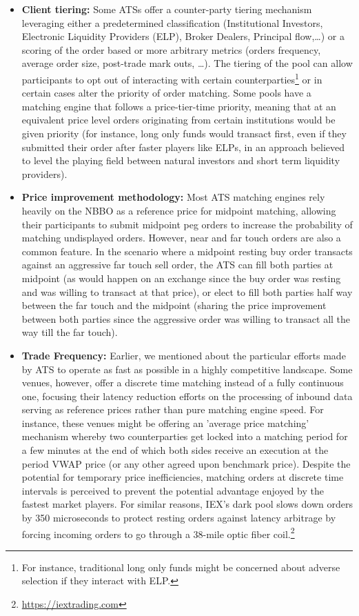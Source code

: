 \begin{itemize}
\item{\textbf{Client tiering:}}\label{in:client_t1} Some ATSs offer a counter-party tiering mechanism leveraging either a predetermined classification (Institutional Investors, Electronic Liquidity Providers (ELP), Broker Dealers, Principal flow,\dots) or a scoring of the order based or more arbitrary metrics (orders frequency, average order size, post-trade mark outs, \dots). The tiering of the pool can allow participants to opt out of interacting with certain counterparties\footnote{For instance, traditional long only funds might be concerned about adverse selection if they interact with ELP.} or in certain cases alter the priority of order matching. Some pools have a matching engine that follows a price-tier-time priority, meaning that at an equivalent price level orders originating from certain institutions would be given priority (for instance, long only funds would transact first, even if they submitted their order after faster players like ELPs, in an approach believed to level the playing field between natural investors and short term liquidity providers). \label{in:client_t2}

\item{\textbf{Price improvement methodology:}} Most ATS matching engines rely heavily on the NBBO as a reference price for midpoint matching, allowing their participants to submit midpoint peg orders to increase the probability of matching undisplayed orders. However, near and far touch orders are also a common feature. In the scenario where a midpoint resting buy order transacts against an aggressive far touch sell order, the ATS can fill both parties at midpoint (as would happen on an exchange since the buy order was resting and was willing to transact at that price), or elect to fill both parties half way between the far touch and the midpoint (sharing the price improvement between both parties since the aggressive order was willing to transact all the way till the far touch). 

\item{\textbf{Trade Frequency:}} Earlier, we mentioned about the particular efforts made by ATS to operate as fast as possible in a highly competitive landscape. Some venues, however, offer a discrete time matching instead of a fully continuous one, focusing their latency reduction efforts on the processing of inbound data serving as reference prices rather than pure matching engine speed. For instance, these venues might be offering an 'average price matching' mechanism whereby two counterparties get locked into a matching period for a few minutes at the end of which both sides receive an execution at the period VWAP price (or any other agreed upon benchmark price). Despite the potential for temporary price inefficiencies, matching orders at discrete time intervals is perceived to prevent the potential advantage enjoyed by the fastest market players. For similar reasons, IEX's dark pool slows down orders by 350 microseconds to protect resting orders against latency arbitrage by forcing incoming orders to go through a 38-mile optic fiber coil.\footnote{\url{https://iextrading.com}}


\end{itemize}

